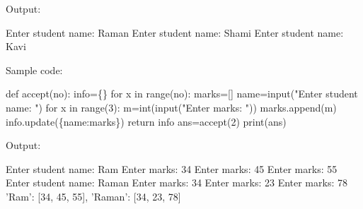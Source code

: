 \begin{flushleft}
	Output:
	\begin{tcolorbox}[breakable,notitle,boxrule=-0pt,colback=output,colframe=output]
		\color{black}
		Enter student name: Raman \newline
		Enter student name: Shami \newline
		Enter student name: Kavi 
		\font=4pt
	\end{tcolorbox}
	
	\bigskip
	Sample code:
	\begin{tcolorbox}[breakable,notitle,boxrule=-0pt,colback=black,colframe=black]
		\color{green}
		\font=9pt
		def accept(no): \newline
		\hphantom{} \hphantom{} info=\{\} \newline
		\hphantom{} \hphantom{} for x in range(no): \newline
		\hphantom{} \hphantom{} \hphantom{} \hphantom{} marks=[] \newline
		\hphantom{} \hphantom{} \hphantom{} \hphantom{}name=input("Enter student name: ") \newline
		\hphantom{} \hphantom{} \hphantom{} \hphantom{} for x in range(3): \newline
		\hphantom{} \hphantom{} \hphantom{} \hphantom{} \hphantom{} \hphantom{} m=int(input("Enter marks: ")) \newline
		\hphantom{} \hphantom{} \hphantom{} \hphantom{} \hphantom{} \hphantom{} marks.append(m) \newline
		\hphantom{} \hphantom{} \hphantom{} \hphantom{} info.update(\{name:marks\}) \newline
		\hphantom{} \hphantom{} return info \newline
		\newline 
		ans=accept(2) \newline
		print(ans)
		\font=4pt
	\end{tcolorbox}
	
	Output:
	\begin{tcolorbox}[breakable,notitle,boxrule=-0pt,colback=output,colframe=output]
		\color{black}
		Enter student name: Ram \newline
		Enter marks: 34 \newline
		Enter marks: 45 \newline
		Enter marks: 55 \newline
		Enter student name: Raman \newline
		Enter marks: 34 \newline
		Enter marks: 23 \newline
		Enter marks: 78 \newline
		{'Ram': [34, 45, 55], 'Raman': [34, 23, 78]}
		\font=4pt
	\end{tcolorbox}
		
\end{flushleft}

\newpage

